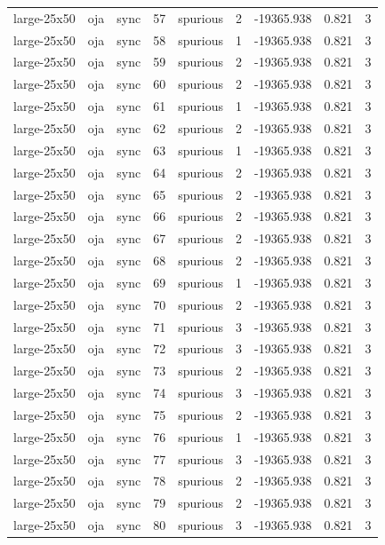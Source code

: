 \begin{tabular}{lllrlrrrr}
large-25x50 & oja & sync & 57 & spurious & 2 & -19365.938 & 0.821 & 3 \\
large-25x50 & oja & sync & 58 & spurious & 1 & -19365.938 & 0.821 & 3 \\
large-25x50 & oja & sync & 59 & spurious & 2 & -19365.938 & 0.821 & 3 \\
large-25x50 & oja & sync & 60 & spurious & 2 & -19365.938 & 0.821 & 3 \\
large-25x50 & oja & sync & 61 & spurious & 1 & -19365.938 & 0.821 & 3 \\
large-25x50 & oja & sync & 62 & spurious & 2 & -19365.938 & 0.821 & 3 \\
large-25x50 & oja & sync & 63 & spurious & 1 & -19365.938 & 0.821 & 3 \\
large-25x50 & oja & sync & 64 & spurious & 2 & -19365.938 & 0.821 & 3 \\
large-25x50 & oja & sync & 65 & spurious & 2 & -19365.938 & 0.821 & 3 \\
large-25x50 & oja & sync & 66 & spurious & 2 & -19365.938 & 0.821 & 3 \\
large-25x50 & oja & sync & 67 & spurious & 2 & -19365.938 & 0.821 & 3 \\
large-25x50 & oja & sync & 68 & spurious & 2 & -19365.938 & 0.821 & 3 \\
large-25x50 & oja & sync & 69 & spurious & 1 & -19365.938 & 0.821 & 3 \\
large-25x50 & oja & sync & 70 & spurious & 2 & -19365.938 & 0.821 & 3 \\
large-25x50 & oja & sync & 71 & spurious & 3 & -19365.938 & 0.821 & 3 \\
large-25x50 & oja & sync & 72 & spurious & 3 & -19365.938 & 0.821 & 3 \\
large-25x50 & oja & sync & 73 & spurious & 2 & -19365.938 & 0.821 & 3 \\
large-25x50 & oja & sync & 74 & spurious & 3 & -19365.938 & 0.821 & 3 \\
large-25x50 & oja & sync & 75 & spurious & 2 & -19365.938 & 0.821 & 3 \\
large-25x50 & oja & sync & 76 & spurious & 1 & -19365.938 & 0.821 & 3 \\
large-25x50 & oja & sync & 77 & spurious & 3 & -19365.938 & 0.821 & 3 \\
large-25x50 & oja & sync & 78 & spurious & 2 & -19365.938 & 0.821 & 3 \\
large-25x50 & oja & sync & 79 & spurious & 2 & -19365.938 & 0.821 & 3 \\
large-25x50 & oja & sync & 80 & spurious & 3 & -19365.938 & 0.821 & 3 \\

\end{tabular}
